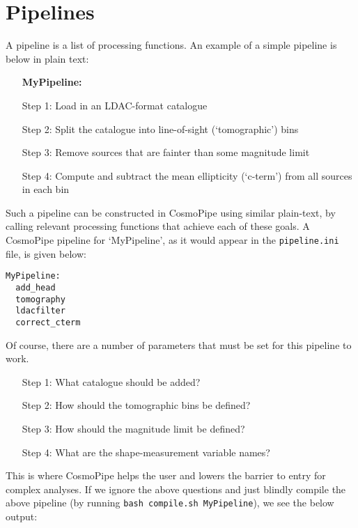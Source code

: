 \documentclass[fleqn,usenatbib]{mnras}
\begin{document}
\section{Pipelines} 
A pipeline is a list of processing functions. An example of a simple pipeline is below in plain text:
\begin{enumerate}
  \item[\textbf{MyPipeline:}]
  \item[Step 1:] Load in an LDAC-format catalogue 
  \item[Step 2:] Split the catalogue into line-of-sight (`tomographic') bins 
  \item[Step 3:] Remove sources that are fainter than some magnitude limit 
  \item[Step 4:] Compute and subtract the mean ellipticity (`c-term') from all sources in each bin 
\end{enumerate}
Such a pipeline can be constructed in CosmoPipe using similar plain-text, by
calling relevant processing functions that achieve each of these goals. A CosmoPipe 
pipeline for `MyPipeline', as it would appear in the \texttt{pipeline.ini} file, 
is given below:
\begin{verbatim}
MyPipeline: 
  add_head 
  tomography
  ldacfilter
  correct_cterm
\end{verbatim}
Of course, there are a number of parameters that must be set for this pipeline to work. 

\begin{itemize} 
  \item[Step 1:] What catalogue should be added? 
  \item[Step 2:] How should the tomographic bins be defined? 
  \item[Step 3:] How should the magnitude limit be defined? 
  \item[Step 4:] What are the shape-measurement variable names? 
\end{itemize}
This is where CosmoPipe helps the user and lowers the barrier to entry for complex analyses. 
If we ignore the above questions and just blindly compile the above pipeline (by running 
\texttt{bash compile.sh MyPipeline}), we see the below output: 
\end{document}
